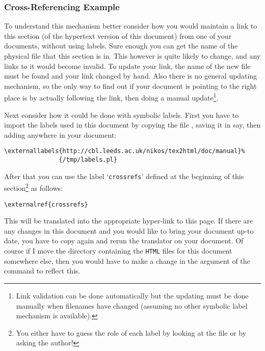 

\subsubsection{Cross-Referencing Example\label{crossrefs}}%
To understand this mechanism better consider 
how you would maintain a link to this section  
(of the hypertext version of this document) from one of your documents,
without using labels.
Sure enough you can get the name of the physical file that this section is in. 
This however is quite likely to change, and any links to it would become invalid. 
%
To update your link, the name of the new file must be found 
and your link changed by hand. 
Also there is no general updating mechanism, so the only way to find
out if your document is pointing to the right place is by actually
following the link, then doing a manual update\footnote{%
Link validation can be done automatically but the updating must be done
manually when filenames have changed (assuming no other symbolic label
mechanism is available).}.

\html{\\}%
Next consider how it could be done with symbolic labels. 
First you have to import the labels used in this document 
by copying the file ,
saving it in  say,
then adding anywhere in your document:
\begin{small}
\begin{verbatim}
\externallabels{http://cbl.leeds.ac.uk/nikos/tex2html/doc/manual}%
               {/tmp/labels.pl}
\end{verbatim}
\end{small}
After that you can use the label `\texttt{crossrefs}' defined at the beginning of this 
section\footnote{You either have to guess the role of each label by
looking at the  file or by asking the author!} as follows:
\begin{small}
\begin{verbatim}
\externalref{crossrefs}
\end{verbatim}
\end{small}
This will be translated into the appropriate hyper-link to this page.
If there are any changes in this document and you would like to
bring your document up-to date, you have to copy 
 again
and rerun the translator on your document. Of course if I move the 
directory containing the \texttt{HTML} files for this document somewhere else, 
then you would have to make a change in the argument of the 
 command to reflect this. 


